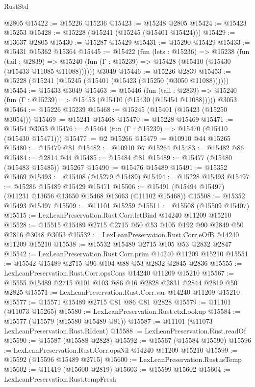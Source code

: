 \begin{lexlean}{RustStd}
\begin{coremodule}
    @2805
@15422 := @15226 @15236
@15423 := @15248 @2805
@15424 := @15423 @15253
@15428 := @15228 (@15241 (@15245 (@15401 @15424)))
@15429 := @13637 @2805
@15430 := @15287 @15429
@15431 := @15290 @15429
@15433 := @15431 @15362 @15364
@15445 := @15422
    (fun (lets : @15236) =>
    @15238
      (fun (tail : @2839) =>
      @15240 (fun (Γ : @15239) => @15428 (@15410 (@15430 (@15433 @11085 @11088))))))
    @3049
@15446 := @15226 @2839
@15453 := @15228 (@15241 (@15245 (@15401 (@15423 (@15250 (@3050 @11088))))))
@15454 := @15433 @3049
@15463 := @15446
    (fun (tail : @2839) => @15240 (fun (Γ : @15239) => @15453 (@15410 (@15430 (@15454 @11088)))))
    @3053
@15464 := @15226 @15239
@15468 := @15245 (@15401 (@15423 (@15250 @3054)))
@15469 := @15241 @15468
@15470 := @15228 @15469
@15471 := @15454 @3053
@15476 := @15464 (fun (Γ : @15239) => @15470 (@15410 (@15430 @15471)))
@15477 := @2 @15266
@15479 := @10910 @44 @15265
@15480 := @15479 @81
@15482 := @10910 @7 @15264
@15483 := @15482 @86
@15484 := @2814 @44
@15485 := @15484 @81
@15489 := @15477 (@15480 (@15483 @15485)) @15267
@15490 := @15476 @15489
@15491 := @15352 @15469
@15493 := @15408 (@15279 @15489)
@15494 := @15228 @15493
@15497 := @15286 @15489 @15429 @15471
@15506 := @15491 (@15494 @15497) (@11231 @13656 @13650 @15468 @13663 (@11102 @15468))
@15508 := @15352 @15493 @15497
@15509 := @11101 @15259
@15511 := @15508 (@15509 @15407)
@15515 := LexLeanPreservation.Rust.Corr.letBind @14240 @11209 @15210
@15528 := @15515 @15489 @2715 @2715 @50 @53 @105 @192 @90 @2849 @50 @2816 @3048 @3053
@15532 := LexLeanPreservation.Rust.Corr.eOfB @14240 @11209 @15210
@15538 := @15532 @15489 @2715 @105 @53 @2832 @2847
@15542 := LexLeanPreservation.Rust.Corr.prim @14240 @11209 @15210
@15551 := @15542 @15489 @2715 @96 @104 @88 @53 @2832 @2845 @2836
@15555 := LexLeanPreservation.Rust.Corr.opsCons @14240 @11209 @15210
@15567 := @15555 @15489 @2715 @101 @103 @86 @16 @2828 @2831 @2844 @2819 @50 @2825
@15571 := LexLeanPreservation.Rust.Corr.var @14240 @11209 @15210
@15577 := @15571 @15489 @2715 @81 @86 @81 @2828
@15579 := @11101 (@11073 @15265)
@15580 := LexLeanPreservation.Rust.ctxLookup
@15584 := @15577 (@15579 (@15580 @15489 @81))
@15587 := @11101 (@11073 LexLeanPreservation.Rust.RIdent)
@15588 := LexLeanPreservation.Rust.readOf
@15590 := @15587 (@15588 @2828)
@15592 := @15567 (@15584 @15590)
@15596 := LexLeanPreservation.Rust.Corr.opsNil @14240 @11209 @15210
@15599 := @15592 (@15596 @15489 @2715)
@15600 := LexLeanPreservation.Rust.isTemp
@15602 := @11419 (@15600 @2819)
@15603 := @15599 @15602
@15604 := LexLeanPreservation.Rust.tempFresh

\end{coremodule}
\end{lexlean}
